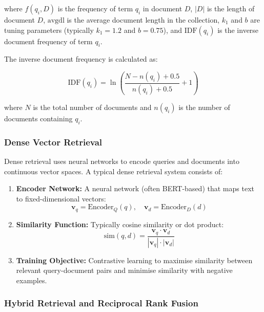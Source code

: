 \documentclass[12pt,a4paper]{report}
\begin{document}
where $f(q_i, D)$ is the frequency of term $q_i$ in document $D$, $|D|$ is the
length of document $D$, $\text{avgdl}$ is the average document length in the
collection, $k_1$ and $b$ are tuning parameters (typically $k_1 = 1.2$ and
$b = 0.75$), and $\text{IDF}(q_i)$ is the inverse document frequency of term
$q_i$.

The inverse document frequency is calculated as:

\begin{equation}
\text{IDF}(q_i) = \ln\left(\frac{N - n(q_i) + 0.5}{n(q_i) + 0.5} + 1\right)
\end{equation}

where $N$ is the total number of documents and $n(q_i)$ is the number of
documents containing $q_i$.

\subsubsection{Dense Vector Retrieval}

Dense retrieval uses neural networks to encode queries and documents into
continuous vector spaces. A typical dense retrieval system consists of:

\begin{enumerate}
    \item \textbf{Encoder Network:} A neural network (often BERT-based) that
    maps text to fixed-dimensional vectors:
    \begin{equation}
    \mathbf{v}_q = \text{Encoder}_Q(q), \quad
    \mathbf{v}_d = \text{Encoder}_D(d)
    \end{equation}

    \item \textbf{Similarity Function:} Typically cosine similarity or dot
    product:
    \begin{equation}
    \text{sim}(q, d) = \frac{\mathbf{v}_q \cdot \mathbf{v}_d}
    {|\mathbf{v}_q| \cdot |\mathbf{v}_d|}
    \end{equation}

    \item \textbf{Training Objective:} Contrastive learning to maximise
    similarity between relevant query-document pairs and minimise similarity
    with negative examples.
\end{enumerate}

\subsubsection{Hybrid Retrieval and Reciprocal Rank Fusion}
\end{document}
